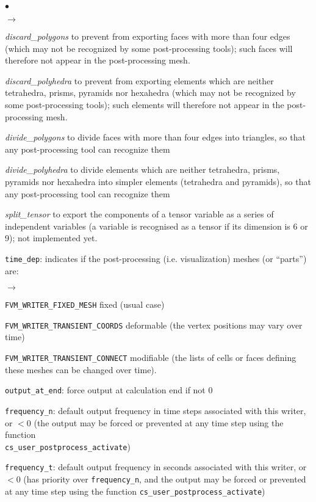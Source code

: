 {{{\begin{list}{$\bullet$}{}
\begin{list}{$\rightarrow$}{}
               \item {\em discard\_polygons} to prevent from exporting faces with more
 than four edges (which may not be recognized by some post-processing tools); such
 faces will therefore not appear in the post-processing mesh.
               \item {\em discard\_polyhedra} to prevent from exporting elements which
 are neither tetrahedra, prisms, pyramids nor hexahedra (which may not be recognized by
 some post-processing tools); such elements will therefore not appear in
 the post-processing mesh.
               \item {\em divide\_polygons}  to divide faces with more than four edges
 into triangles, so that any post-processing tool can recognize them
               \item {\em divide\_polyhedra} to divide elements which are neither
 tetrahedra, prisms, pyramids nor hexahedra into simpler elements (tetrahedra and
 pyramids), so that any post-processing tool can recognize them
               \item {\em split\_tensor} to export the components of a tensor
 variable as a series of independent variables (a variable is recognised as a
 tensor if its dimension is 6 or 9); not implemented yet.
         \end{list}
       \item \texttt{time\_dep}: indicates if the post-processing
             (i.e. visualization) meshes (or ``parts'') are:
        \begin{list}{$\rightarrow$}{}
               \item \texttt{FVM\_WRITER\_FIXED\_MESH} fixed (usual case)
               \item \texttt{FVM\_WRITER\_TRANSIENT\_COORDS} deformable
                     (the vertex positions may vary over time)
               \item \texttt{FVM\_WRITER\_TRANSIENT\_CONNECT} modifiable
                     (the lists of cells or faces
                     defining these meshes can be changed over time).
         \end{list}
       \item \texttt{output\_at\_end}: force output at calculation end
             if not 0
       \item \texttt{frequency\_n}: default output frequency in time steps
             associated with this writer, or $< 0$ (the output may be forced
             or prevented at any time step using the function\\
             \texttt{cs\_user\_postprocess\_activate})
       \item \texttt{frequency\_t}: default output frequency in seconds
             associated with this writer, or $< 0$ (has priority over
             \texttt{frequency\_n}, and the output may be forced or prevented
             at any time step using the function
             \texttt{cs\_user\_postprocess\_activate})
\end{list}

}}}
